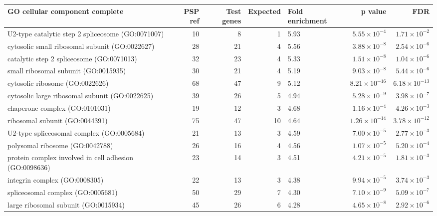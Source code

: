 \begin{table}[ht]
\centering
\begin{adjustbox}{width=\textwidth}


\begin{tabular}{lrrrlrr}
  \hline
GO cellular component complete & PSP ref & Test genes & Expected & Fold enrichment & p value & FDR \\ 
  \hline
U2-type catalytic step 2 spliceosome (GO:0071007) & 10 & 8 & 1 & 5.93 & $5.55 \times 10^{-4}$ & $1.71 \times 10^{-2}$ \\ 
  cytosolic small ribosomal subunit (GO:0022627) & 28 & 21 & 4 & 5.56 & $3.88 \times 10^{-8}$ & $2.54 \times 10^{-6}$ \\ 
  catalytic step 2 spliceosome (GO:0071013) & 32 & 23 & 4 & 5.33 & $1.51 \times 10^{-8}$ & $1.04 \times 10^{-6}$ \\ 
  small ribosomal subunit (GO:0015935) & 30 & 21 & 4 & 5.19 & $9.03 \times 10^{-8}$ & $5.44 \times 10^{-6}$ \\ 
  cytosolic ribosome (GO:0022626) & 68 & 47 & 9 & 5.12 & $8.21 \times 10^{-16}$ & $6.18 \times 10^{-13}$ \\ 
  cytosolic large ribosomal subunit (GO:0022625) & 39 & 26 & 5 & 4.94 & $5.28 \times 10^{-9}$ & $3.98 \times 10^{-7}$ \\ 
  chaperone complex (GO:0101031) & 19 & 12 & 3 & 4.68 & $1.16 \times 10^{-4}$ & $4.26 \times 10^{-3}$ \\ 
  ribosomal subunit (GO:0044391) & 75 & 47 & 10 & 4.64 & $1.26 \times 10^{-14}$ & $3.78 \times 10^{-12}$ \\ 
  U2-type spliceosomal complex (GO:0005684) & 21 & 13 & 3 & 4.59 & $7.00 \times 10^{-5}$ & $2.77 \times 10^{-3}$ \\ 
  polysomal ribosome (GO:0042788) & 26 & 16 & 4 & 4.56 & $1.07 \times 10^{-5}$ & $5.20 \times 10^{-4}$ \\ 
  protein complex involved in cell adhesion (GO:0098636) & 23 & 14 & 3 & 4.51 & $4.21 \times 10^{-5}$ & $1.81 \times 10^{-3}$ \\ 
  integrin complex (GO:0008305) & 22 & 13 & 3 & 4.38 & $9.94 \times 10^{-5}$ & $3.74 \times 10^{-3}$ \\ 
  spliceosomal complex (GO:0005681) & 50 & 29 & 7 & 4.30 & $7.10 \times 10^{-9}$ & $5.09 \times 10^{-7}$ \\ 
  large ribosomal subunit (GO:0015934) & 45 & 26 & 6 & 4.28 & $4.65 \times 10^{-8}$ & $2.92 \times 10^{-6}$ \\ 

\end{tabular}
\end{adjustbox}
\end{table}
